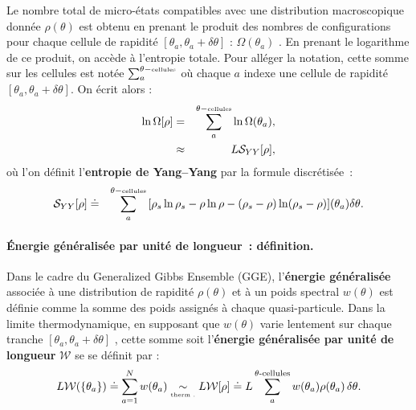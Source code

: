 
Le nombre total de micro-états compatibles avec une distribution macroscopique donnée $\rho(\theta)$ est obtenu en prenant le produit des nombres de configurations pour chaque cellule de rapidité $[\theta_a, \theta_a + \delta \theta]$ : $ \Omega(\theta_a)$ .
En prenant le logarithme de ce produit, on accède à l'entropie totale. Pour alléger la notation, cette somme sur les cellules est notée
\(
	\sum_a^{\theta-\mbox{\tiny cellules}}	
\)
où chaque $a$ indexe une cellule de rapidité $[\theta_a, \theta_a + \delta\theta]$.
On écrit alors :
\begin{eqnarray}
    \ln \Omega[\rho] & = & \sum_a^{\theta-\mbox{\tiny cellules}} \ln \Omega(\theta_a), \\
    & \approx &   L\mathcal{S}_{YY} [ \rho ] , 	
\end{eqnarray}
où l’on définit l’\textbf{entropie de Yang–Yang} par la formule discrétisée :
\begin{eqnarray}
    \mathcal{S}_{YY}[\rho] & \doteq & \sum_a^{\theta-\mbox{\tiny cellules}} \, [ \rho_s\ln \rho_s - \rho \ln \rho - ( \rho_s - \rho ) \ln ( \rho_s - \rho ) ] (\theta_a) \delta \theta .
\end{eqnarray}



\paragraph{Énergie généralisée par unité de longueur : définition.}

Dans le cadre du Generalized Gibbs Ensemble (GGE), l’\textbf{énergie généralisée} associée à une distribution de rapidité $\rho(\theta)$ et à un poids spectral $w(\theta)$ est définie comme la somme des poids assignés à chaque quasi-particule. 
Dans la limite thermodynamique, en supposant que $w(\theta)$ varie lentement sur chaque tranche $[\theta_a, \theta_a + \delta\theta]$ ,  cette somme soit l’\textbf{énergie généralisée par unité de longueur} $\mathcal{W}$ se se définit par :
\begin{eqnarray}
	L \mathcal{W}(\{\theta_a\}) \doteq  \sum_{a = 1}^N w(\theta_a) 
	 \underset{\mbox{\tiny therm .}}{\sim}  L \mathcal{W}[\rho]  \doteq  L \sum_a^{\theta\text{-cellules}} w(\theta_a) \rho(\theta_a)\, \delta\theta. 
\end{eqnarray}

